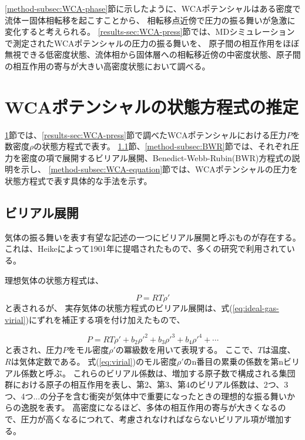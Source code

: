 \documentclass[titlepage]{jsreport}
\begin{document}
{{{\ref{method-subsec:WCA-phase}節に示したように、WCAポテンシャルはある密度で流体ー固体相転移を起こすことから、
相転移点近傍で圧力の振る舞いが急激に変化すると考えられる。
\ref{results-sec:WCA-press}節では、MDシミュレーションで測定されたWCAポテンシャルの圧力の振る舞いを、
原子間の相互作用をほぼ無視できる低密度状態、流体相から固体層への相転移近傍の中密度状態、原子間の相互作用の寄与が大きい高密度状態において調べる。

\section{WCAポテンシャルの状態方程式の推定}\label{method-sec:WCA-equation}
\ref{method-sec:WCA-equation}節では、\ref{results-sec:WCA-press}節で調べたWCAポテンシャルにおける圧力$P$を数密度$\rho$の状態方程式で表す。
\ref{method-subsec:virial}節、\ref{method-subsec:BWR}節では、それぞれ圧力を密度の項で展開するビリアル展開、Benedict-Webb-Rubin(BWR)方程式の説明を示し、
\ref{method-subsec:WCA-equation}節では、WCAポテンシャルの圧力を状態方程式で表す具体的な手法を示す。

\subsection{ビリアル展開}\label{method-subsec:virial}
気体の振る舞いを表す有望な記述の一つにビリアル展開と呼ぶものが存在する。
これは、Heikeによって1901年に提唱されたもの\cite{virial-Heike}で、多くの研究で利用されている\cite{virial-expansion-example1,virial-expansion-example2,virial-expansion-example3}。

理想気体の状態方程式は、

\large
\begin{equation}
P=RT{\rho}' \label{eq:ideal-gas-virial}
\end{equation}
\normalsize
と表されるが、
実存気体の状態方程式のビリアル展開は、式(\ref{eq:ideal-gas-virial})にずれを補正する項を付け加えたもので、

\large
\begin{equation}
P=RT{\rho}'+b_2{{\rho}'}^2+b_3{{\rho}'}^3+b_4{{\rho}'}^4+\cdots \label{eq:virial}
\end{equation}
\normalsize
と表され、圧力$P$をモル密度${\rho}'$の冪級数を用いて表現する。
ここで、$T$は温度、$R$は気体定数である。
式(\ref{eq:virial})のモル密度${\rho}'$のn番目の累乗の係数を第nビリアル係数と呼ぶ\cite{virial-expansion}。
これらのビリアル係数は、増加する原子数で構成される集団群における原子の相互作用を表し、第2、第3、第4のビリアル係数は、2つ、3つ、4つ...の分子を含む衝突が気体中で重要になったときの理想的な振る舞いからの逸脱を表す。
高密度になるほど、多体の相互作用の寄与が大きくなるので、圧力が高くなるにつれて、考慮されなければならないビリアル項が増加する\cite{virial-Heike}。

}}}
\end{document}
